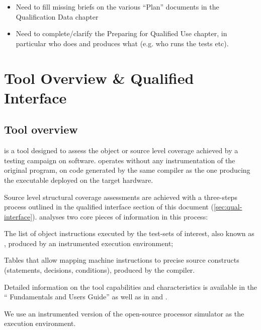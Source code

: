 \documentclass {report}
\begin{document}
\begin{itemize}
\item%
  Need to fill missing briefs on the various ``Plan'' documents in
  the Qualification Data chapter
%
\item%
  Need to complete/clarify the Preparing for Qualified Use chapter,
  in particular who does and produces what (e.g. who runs the tests etc).
\end{itemize}



\chapter{Tool Overview \& Qualified Interface}

\section{Tool overview}

\xcov{} is a tool designed to assess the object or source level coverage
achieved by a testing campaign on software.
%
\xcov{} operates without any instrumentation of the original program, on
code generated by the same compiler as the one producing the executable
deployed on the target hardware.

Source level structural coverage assessments are achieved with a three-steps
process outlined in the qualified interface section of this document
(\ref{sec:qual-interface}).
%
\xcov{} analyses two core pieces of information in this process:

\begin{Itemize}
%
\item The list of object instructions executed by the test-sets of interest,
  also known as , produced by an instrumented execution
  environment;
%
\item Tables that allow mapping machine instructions to precise source
  constructs (statements, decisions, conditions), produced by the compiler.
\end{Itemize}

Detailed information on the tool capabilities and characteristics is available
in the ``\xcov{} Fundamentals and Users Guide'' as well as in \adaeurope and
\erts.

We use an instrumented version of the \qemu{} open-source processor simulator
as the execution environment.
\end{document}
